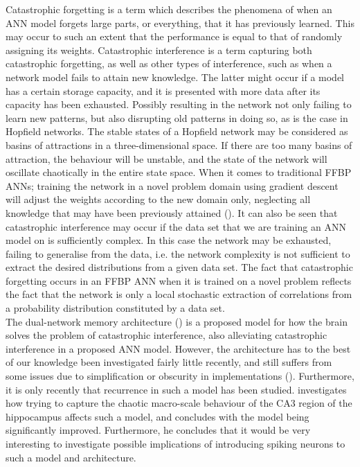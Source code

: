 Catastrophic forgetting \cite{McCloskey1989} is a term which describes the phenomena of when an ANN model forgets large parts, or everything, that it has previously learned. This may occur to such an extent that the performance is equal to that of randomly assigning its weights. Catastrophic interference is a term capturing both catastrophic forgetting, as well as other types of interference, such as when a network model fails to attain new knowledge. The latter might occur if a model has a certain storage capacity, and it is presented with more data after its capacity has been exhausted. Possibly resulting in the network not only failing to learn new patterns, but also disrupting old patterns in doing so, as is the case in Hopfield networks. The stable states of a Hopfield network may be considered as basins of attractions in a three-dimensional space. If there are too many basins of attraction, the behaviour will be unstable, and the state of the network will oscillate chaotically in the entire state space.
When it comes to traditional FFBP ANNs; training the network in a novel problem domain using gradient descent will adjust the weights according to the new domain only, neglecting all knowledge that may have been previously attained (\cite{McCloskey1989, French1999, French2001}).
It can also be seen that catastrophic interference may occur if the data set that we are training an ANN model on is sufficiently complex. In this case the network may be exhausted, failing to generalise from the data, i.e. the network complexity is not sufficient to extract the desired distributions from a given data set. 
The fact that catastrophic forgetting occurs in an FFBP ANN when it is trained on a novel problem reflects the fact that the network is only a local stochastic extraction of correlations from a probability distribution constituted by a data set.
\\

The dual-network memory architecture (\cite{McClelland1995}) is a proposed model for how the brain solves the problem of catastrophic interference, also alleviating catastrophic interference in a proposed ANN model. However, the architecture has to the best of our knowledge been investigated fairly little recently, and still suffers from some issues due to simplification or obscurity in implementations (\cite{French1997, French2001, Hattori2010, Hattori2014}). Furthermore, it is only recently that recurrence in such a model has been studied. \cite{Hattori2014} investigates how trying to capture the chaotic macro-scale behaviour of the CA3 region of the hippocampus affects such a model, and concludes with the model being significantly improved. Furthermore, he concludes that it would be very interesting to investigate possible implications of introducing spiking neurons to such a model and architecture.
\\

